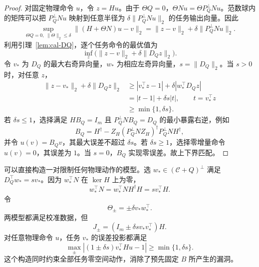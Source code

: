 \documentclass[11pt,a4paper]{article}
\numberwithin{equation}{section}
\theoremstyle{definition}
\begin{document}
\begin{proof}
对固定物理命令 $u$，令 $z=Hu$。由于 $\Theta Q=0$，$\Theta Nu=\Theta P_Q^\perp Nu$。范数球内的矩阵可以把 $P_Q^\perp Nu$ 映射到任意半径为 $\delta\|P_Q^\perp Nu\|_2$ 的任务输出向量。因此
\begin{equation}
  \sup_{\Theta Q=0,\;\|\Theta\|_2\le\delta}
  \|(H+\Theta N)u-v\|_2
  =
  \|z-v\|_2+\delta\|P_Q^\perp Nu\|_2 .
  \label{eq:cal-task-ball}
\end{equation}
利用引理~\ref{lem:cal-DQ}，逐个任务命令的最优值为
\begin{equation}
  \inf_z\big(\|z-v\|_2+\delta\|D_Qz\|_2\big).
  \label{eq:cal-task-prox}
\end{equation}
令 $v_*$ 为 $D_Q$ 的最大右奇异向量，$w_*$ 为相应左奇异向量，$s=\|D_Q\|_2$。当 $s>0$ 时，对任意 $z$，
\begin{align}
  \|z-v_*\|_2+\delta\|D_Qz\|_2
  &\ge
  |v_*^\top z-1|
  +\delta|w_*^\top D_Qz|\\
  &=
  |t-1|+\delta s|t|,
  \qquad t=v_*^\top z\\
  &\ge\min\{1,\delta s\}.
\end{align}
若 $\delta s\le1$，选择满足 $HB_Q=I_m$ 且 $P_Q^\perp NB_Q=D_Q$ 的最小暴露右逆，例如
\begin{equation}
  B_Q=
  H^\dagger-
  Z_H(P_Q^\perp NZ_H)^\dagger
  P_Q^\perp NH^\dagger ,
  \label{eq:cal-BQ}
\end{equation}
并令 $u(v)=B_Qv$，其最大误差不超过 $\delta s$。若 $\delta s\ge1$，选择零增量命令 $u(v)=0$，其误差为 $1$。当 $s=0$，$B_Q$ 实现零误差。故上下界匹配。
\end{proof}

可以直接构造一对限制任何物理动作的模型。选 $w_*\in(\mathcal C+Q)^\perp$ 满足 $D_Q^\top w_*=sv_*$。因为 $w_*^\top N$ 在 $\ker H$ 上为零，
\begin{equation}
  w_*^\top N
  =w_*^\top NH^\dagger H
  =sv_*^\top H .
  \label{eq:cal-adversary-factor}
\end{equation}
令
\begin{equation}
  \Theta_\pm=\pm\delta v_*w_*^\top .
\end{equation}
两模型都满足校准数据，但
\begin{equation}
  J_\pm=
  (I_m\pm\delta s v_*v_*^\top)H .
  \label{eq:cal-adversary-J}
\end{equation}
对任意物理命令 $u$，任务 $v_*$ 的误差投影都满足
\begin{equation}
  \max_{\pm}
  \left|
  (1\pm\delta s)v_*^\top Hu-1
  \right|
  \ge\min\{1,\delta s\}.
  \label{eq:cal-anyphysical-lower}
\end{equation}
这个构造同时约束全部任务零空间动作，消除了预先固定 $B$ 所产生的漏洞。
\end{document}
